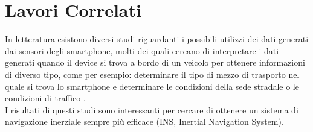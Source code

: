 \documentclass[12pt,a4paper,openright,twoside]{report}
\begin{document}
\begin{titlepage}                       %
%
\thispagestyle{empty}                   %
\topmargin=6.5cm                        %
\raggedleft                             %
\large                                  %
                             
%
\clearpage{\pagestyle{empty}\cleardoublepage}%
\end{titlepage}
\chapter{Lavori Correlati}                 %

In letteratura esistono diversi studi riguardanti i possibili utilizzi dei dati generati dai sensori degli smartphone, molti dei quali cercano di interpretare i dati generati quando il device si trova a bordo di un veicolo per ottenere informazioni di diverso tipo, come per esempio: determinare il tipo di mezzo di trasporto nel quale si trova lo smartphone \cite{K1, K2, K3, K4} e determinare le condizioni della sede stradale o le condizioni di traffico \cite{K5, K6}. \\

I risultati di questi studi sono interessanti per cercare di ottenere un sistema di navigazione inerziale sempre più efficace (INS, Inertial Navigation System).
\end{document}
